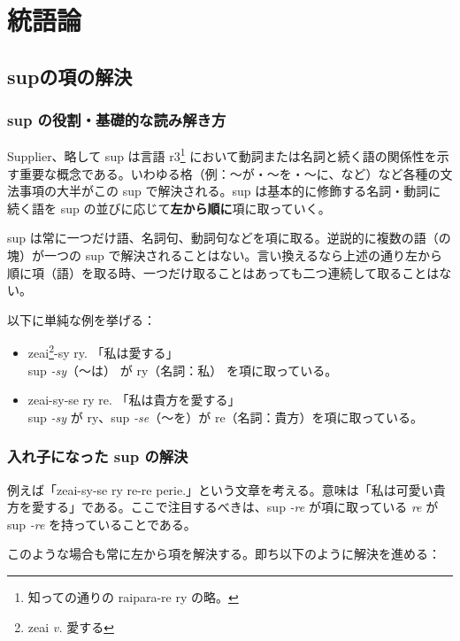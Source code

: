 \section{統語論}

\subsection{supの項の解決}

\subsubsection{sup の役割・基礎的な読み解き方}

Supplier、略して sup は言語 r3\footnote{知っての通りの raipara-re ry の略。} において動詞または名詞と続く語の関係性を示す重要な概念である。いわゆる格（例：～が・～を・～に、など）など各種の文法事項の大半がこの sup で解決される。sup は基本的に修飾する名詞・動詞に続く語を sup の並びに応じて\textbf{左から順に}項に取っていく。

sup は常に一つだけ語、名詞句、動詞句などを項に取る。逆説的に複数の語（の塊）が一つの sup で解決されることはない。言い換えるなら上述の通り左から順に項（語）を取る時、一つだけ取ることはあっても二つ連続して取ることはない。

以下に単純な例を挙げる：

\begin{itemize}
    \item zeai\footnote{zeai \emph{v.} 愛する}-sy ry. 「私は愛する」\\ sup \emph{-sy}（～は） が ry（名詞：私） を項に取っている。
    \item zeai-sy-se ry re. 「私は貴方を愛する」\\ sup \emph{-sy} が ry、sup \emph{-se}（～を）が re（名詞：貴方）を項に取っている。
\end{itemize}

\subsubsection{入れ子になった sup の解決}

例えば「zeai-sy-se ry re-re perie.」という文章を考える。意味は「私は可愛い貴方を愛する」である。ここで注目するべきは、sup \emph{-re} が項に取っている \emph{re} が sup \emph{-re} を持っていることである。

このような場合も常に左から項を解決する。即ち以下のように解決を進める：

